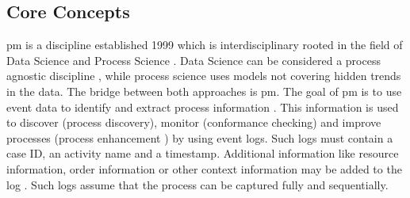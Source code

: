 \subsection{Core Concepts}
\label{sec:core-concepts}
\gls{pm} is a discipline established 1999 which is interdisciplinary rooted in the field of Data Science and Process Science \autocite{van2016data}. Data Science can be considered a process agnostic discipline \autocite{van2016data}, while process science uses models not covering hidden trends in the data. The bridge between both approaches is \gls{pm}. The goal of \gls{pm} is to use event data to identify and extract process information \autocite{vanderAalst2012}. This information is used to discover (process discovery), monitor (conformance checking) and improve processes (process enhancement \autocite{vanderAalst2012}) by using event logs. Such logs must contain a case ID, an activity name and a timestamp. Additional information like resource information, order information or other context information may be added to the log \autocite{vanderAalst2012}. Such logs assume that the process can be captured fully and sequentially.

